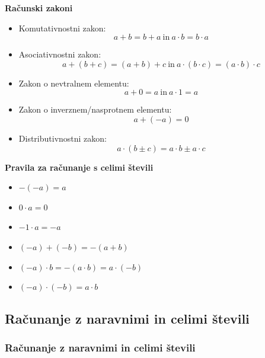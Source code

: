         \begin{frame}
            \textbf{\large{Računski zakoni}}

            \smallskip
            \begin{itemize}
                \item Komutativnostni zakon: $$a+b = b+a ~\text{in}~ a \cdot b = b \cdot a$$
                \item Asociativnostni zakon: $$a+(b+c) = (a+b)+c ~\text{in}~ a \cdot (b \cdot c) = (a \cdot b) \cdot c$$
                \item Zakon o nevtralnem elementu: $$a+0 = a ~\text{in}~ a \cdot 1 = a$$
                \item Zakon o inverznem/nasprotnem elementu: $$a+(-a) = 0$$
                \item Distributivnostni zakon: $$a \cdot (b \pm c) = a \cdot b \pm a \cdot c$$
            \end{itemize}


        \end{frame}

        \begin{frame}
            \textbf{\large{Pravila za računanje s celimi števili}}

            \bigskip
            \begin{itemize}
                \item $-(-a)=a$
                \item $0\cdot a=0$
                \item $-1 \cdot a =-a$
                \item $(-a)+(-b)=-(a+b)$
                \item $(-a)\cdot b=-(a\cdot b)=a\cdot (-b)$
                \item $(-a)\cdot(-b)=a\cdot b$
            \end{itemize}
        \end{frame}

        \begin{frame}

        \end{frame}


    \subsection{Računanje z naravnimi in celimi števili}

        \begin{frame}
            \frametitle{Računanje z naravnimi in celimi števili}
        \end{frame}

